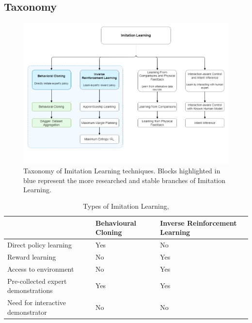 \documentclass{article}
\begin{document}
\subsection{Taxonomy}\label{sec:Taxonomy}

\begin{figure}[h]
	\centering
	\includegraphics[width=\linewidth]{images/IRL_Taxonomy.png}
	\caption{Taxonomy of Imitation Learning techniques. Blocks highlighted in blue represent the more researched and stable branches of Imitation Learning.}
	\label{fig:taxonomy}
\end{figure}

\begingroup
\setlength{\tabcolsep}{6pt}
\begin{table}[h!]
	\centering
	\renewcommand{\arraystretch}{1.5} 
	\begin{tabular}{L{6cm} L{3cm} L{3cm}}
		\midrule[0.01pt]
		& \textbf{Behavioural Cloning} & \textbf{Inverse Reinforcement Learning}\\
		\midrule[0.01pt]
		Direct policy learning & Yes & No \\
		Reward learning & No & Yes \\
		Access to environment & No & Yes \\
		Pre-collected expert demonstrations & Yes & Yes \\
		Need for interactive demonstrator & No & No \\
		\midrule[0.01pt]
	\end{tabular}
	\caption{Types of Imitation Learning, \cite{yue2018imitation}}
	\label{tbl:BC_IRL}
\end{table}
\endgroup
\end{document}
